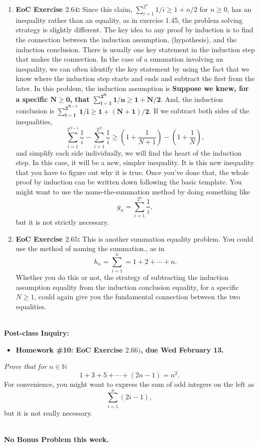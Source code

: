 \documentclass[12pt,letterpaper]{article}
\theoremstyle{definition}
\begin{document}
\begin{enumerate}
    \item {\bfseries EoC Exercise $2.64$:} Since this claim, 
    $\sum_{i=1}^{2^n} 1/i \geq 1 + n/2$ for $n\geq 0$, has an inequality
    rather than an equality, as in exercise 1.45, the problem solving
    strategy is slightly different. The key idea to any proof by induction is
    to find the
    connection between the induction assumption, (hypothesis), and the
    induction conclusion. There is usually one key statement in the induction
    step that makes the connection. In the case of a summation involving an
    inequality, we can often identify the key statement by using the fact
    that we know where the induction step starts and ends and subtract the
    first from the later. In this problem, the induction assumption is
    \textbf{Suppose we knew, for a specific $\mathbf{N\geq0}$, that
    $\mathbf{\sum_{i=1}^{2^N} 1/n \geq 1+N/2.}$} And, the induction
    conclusion is
    $\mathbf{\sum_{i=1}^{2^{N+1}} 1/i \geq 1 + (N+1)/2.}$ If we subtract both
    sides of the inequalities,
    \[
        \sum_{i=1}^{2^{N+1}} \frac{1}{i} - \sum_{i=1}^{2^N} \frac{1}{i}
         \geq \left(1+\frac{1}{N+1} \right) - \left(1+\frac{1}{N} \right),
    \]
    and simplify each side individually, we will find the heart of the
    induction step. In this case, it will be a new, simpler inequality. It is
    this new inequality that you have to figure out why it is true. Once
    you've done that, the whole proof by induction can be written down
    following the basic template. You might want to use the name-the-summation method by doing something like
    \[
        g_n= \sum_{i=1}^{2^n} \frac{1}{i},
    \]
    but it is not strictly necessary.
    
    \item {\bfseries EoC Exercise $2.65$:} This is another summation equality problem. You could use the method of naming the summation., as in
    \[
        h_n = \sum_{i=1}^n = 1 + 2 + \cdots + n. 
    \]
    Whether you do this or not, the strategy of subtracting the induction assumption equality from the induction conclusion equality, for a specific $N\geq1$, could again give you the fundamental connection between the two equalities.
    
\end{enumerate}

\hrulefill\\

\textbf{\large Post-class Inquiry:}
\begin{itemize}
    \item \textbf{Homework \#10: EoC Exercise $2.66)$, due Wed February
                                                                13.}
\end{itemize}
\textit{Prove that for $n\in\mathbb{N}$}
\[
    1+3+5+\cdots+(2n-1) = n^2.
\]
For convenience, you might want to express the sum of odd integers on the left as
\[
    \sum_{i=1}^n (2i-1),
\]
but it is not really necessary.


\hrulefill\\


\textbf{\large No Bonus Problem this week.}

\hrulefill
\end{document}
